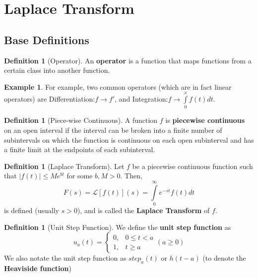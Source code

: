\documentclass[12pt]{article}
\theoremstyle{definition}
\newtheorem{defn}[thm]{Definition}
\newtheorem{eg}[thm]{Example}
\theoremstyle{remark}
\numberwithin{equation}{section}
\newcommand\B[1]{\textbf{ #1}}
\begin{document}
\section{Laplace Transform}


\subsection{Base Definitions}

\begin{defn}[Operator]
        An \B{operator} is a function that maps functions from a certain class into another function.
\end{defn}
\begin{eg}
        For example, two common operators (which are in fact linear operators) are Differentiation:$f\rightarrow f'$, and Integration:$f\rightarrow \int\limits_{0}^xf(t)dt$.
\end{eg}


\vspace{1cm}


\begin{defn}[Piece-wise Continuous]
        A function $f$ is \B{piecewise continuous} on an open interval if the interval can be broken into a finite number of subintervals on which the function is continuous on each open subinterval and has a finite limit at the endpoints of each subinterval.
\end{defn}


\vspace{1cm}

\begin{defn}[Laplace Transform]
        Let $f$ be a piecewise continuous function such that $|f(t)| \leq Me^{bt}$ for some $b,M > 0$. Then, \begin{equation}
                F(s) = \mathcal{L}[f(t)](s) = \int\limits_{0}^{\infty}e^{-st}f(t)dt
        \end{equation} 
        is defined (usually $s > 0$), and is called the \B{Laplace Transform} of $f$.
\end{defn}


\vspace{1cm}


\begin{defn}[Unit Step Function]
        We define the \B{unit step function} as \begin{equation}
                u_a(t) = \left\{\begin{array}{cc} 0, & 0\leq t < a \\ 1, & t \geq a \end{array}\right. (a \geq 0)
        \end{equation}
        We also notate the unit step function as $step_a(t)$ or $h(t-a)$ (to denote the \B{Heaviside function})
\end{defn}
\end{document}
